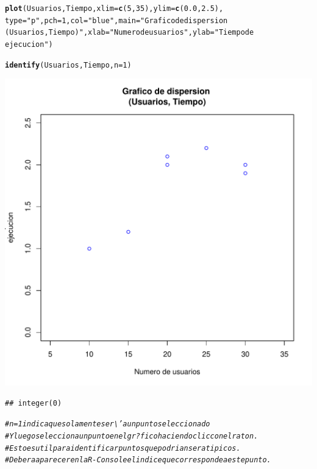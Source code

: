 \documentclass[12pt,letterpaper]{article}\usepackage[]{graphicx}\usepackage[]{color}
\makeatletter
\def\maxwidth{ %
  \ifdim\Gin@nat@width>\linewidth
    \linewidth
  \else
    \Gin@nat@width
  \fi
}
\newcommand{\hlnum}[1]{\textcolor[rgb]{0.686,0.059,0.569}{#1}}%
\newcommand{\hlstr}[1]{\textcolor[rgb]{0.192,0.494,0.8}{#1}}%
\newcommand{\hlcom}[1]{\textcolor[rgb]{0.678,0.584,0.686}{\textit{#1}}}%
\newcommand{\hlstd}[1]{\textcolor[rgb]{0.345,0.345,0.345}{#1}}%
\newcommand{\hlkwc}[1]{\textcolor[rgb]{0.333,0.667,0.333}{#1}}%
\newcommand{\hlkwd}[1]{\textcolor[rgb]{0.737,0.353,0.396}{\textbf{#1}}}%
\newenvironment{kframe}{%
 \def\at@end@of@kframe{}%
 \ifinner\ifhmode%
  \def\at@end@of@kframe{\end{minipage}}%
  \begin{minipage}{\columnwidth}%
 \fi\fi%
 \def\FrameCommand##1{\hskip\@totalleftmargin \hskip-\fboxsep
 \colorbox{shadecolor}{##1}\hskip-\fboxsep
     \hskip-\linewidth \hskip-\@totalleftmargin \hskip\columnwidth}%
 \MakeFramed {\advance\hsize-\width
   \@totalleftmargin\z@ \linewidth\hsize
   \@setminipage}}%
 {\par\unskip\endMakeFramed%
 \at@end@of@kframe}
\newenvironment{knitrout}{}{} %
\makeatother
\begin{document}
\begin{enumerate}
\begin{knitrout}
\begin{kframe}
\begin{alltt}
\hlkwd{plot}\hlstd{(Usuarios, Tiempo,} \hlkwc{xlim}\hlstd{=} \hlkwd{c}\hlstd{(}\hlnum{5}\hlstd{,} \hlnum{35}\hlstd{),} \hlkwc{ylim}\hlstd{=} \hlkwd{c}\hlstd{(}\hlnum{0.0}\hlstd{,} \hlnum{2.5}\hlstd{),}
\hlkwc{type} \hlstd{=} \hlstr{"p"}\hlstd{,} \hlkwc{pch}\hlstd{=}\hlnum{1}\hlstd{,} \hlkwc{col} \hlstd{=} \hlstr{"blue"}\hlstd{,} \hlkwc{main} \hlstd{=} \hlstr{"Grafico de dispersion 
(Usuarios, Tiempo)"}\hlstd{,} \hlkwc{xlab}\hlstd{=}\hlstr{"Numero de usuarios"}\hlstd{,} \hlkwc{ylab}\hlstd{=}\hlstr{"Tiempo de 
ejecucion"}\hlstd{)}

\hlkwd{identify}\hlstd{(Usuarios, Tiempo,} \hlkwc{n}\hlstd{=}\hlnum{1}\hlstd{)}
\end{alltt}
\end{kframe}
\includegraphics[width=\maxwidth]{figure/unnamed-chunk-10-1} 
\begin{kframe}\begin{verbatim}
## integer(0)
\end{verbatim}
\begin{alltt}
\hlcom{# n=1 indicaque solamente ser\textbackslash{}'a un punto seleccionado }
\hlcom{# Y luego selecciona un punto en el gr?fico haciendo clic con el raton.}
\hlcom{# Esto es util para identificar puntos que podrian ser atipicos.}
\hlcom{# Debera aparecer en la R-Console el indice que corresponde a este punto. }
\end{alltt}
\end{kframe}
\end{knitrout}


\end{enumerate}
\end{document}
